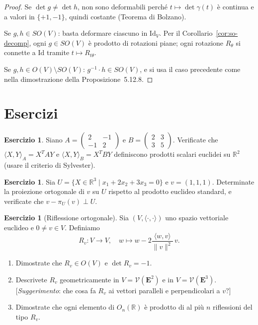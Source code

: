\documentclass[11pt, a4paper]{book}
\theoremstyle{definition}
\newtheorem{esercizio}[definizione]{Esercizio}
\theoremstyle{plain}
\theoremstyle{remark}
\newcommand{\R}{\mathbb{R}}
\newcommand{\Id}{\mathrm{Id}}
\begin{document}
\begin{proof}
Se $\det g \neq \det h$, non sono deformabili perché $t \mapsto \det\gamma(t)$ è continua e a valori in $\{+1,-1\}$, quindi costante (Teorema di Bolzano).

Se $g,h \in SO(V)$: basta deformare ciascuno in $\Id_V$. Per il Corollario~\ref{cor:so-decomp}, ogni $g \in SO(V)$ è prodotto di rotazioni piane; ogni rotazione $R_\theta$ si connette a $\Id$ tramite $t \mapsto R_{t\theta}$.

Se $g,h \in O(V)\setminus SO(V)$: $g^{-1}\cdot h \in SO(V)$, e si usa il caso precedente come nella dimostrazione della Proposizione~5.12.8.
\end{proof}

\section*{Esercizi}

\begin{esercizio}
Siano $A = \begin{pmatrix}2&-1\\-1&2\end{pmatrix}$ e $B = \begin{pmatrix}2&3\\3&5\end{pmatrix}$. Verificate che $\langle X,Y\rangle_A = X^T A Y$ e $\langle X,Y\rangle_B = X^T B Y$ definiscono prodotti scalari euclidei su $\R^2$ (usare il criterio di Sylvester).
\end{esercizio}

\begin{esercizio}
Sia $U = \{X \in \R^3 \mid x_1+2x_2+3x_3=0\}$ e $v=(1,1,1)$. Determinate la proiezione ortogonale di $v$ su $U$ rispetto al prodotto euclideo standard, e verificate che $v - \pi_U(v) \perp U$.
\end{esercizio}

\begin{esercizio}[Riflessione ortogonale]
Sia $(V,\langle\cdot,\cdot\rangle)$ uno spazio vettoriale euclideo e $0 \neq v \in V$. Definiamo
\[
  R_v \colon V \to V, \quad w \mapsto w - 2\frac{\langle w,v\rangle}{\|v\|^2}\,v.
\]
\begin{enumerate}
  \item Dimostrate che $R_v \in O(V)$ e $\det R_v = -1$.
  \item Descrivete $R_v$ geometricamente in $V = \mathcal{V}(\mathbf{E}^2)$ e in $V = \mathcal{V}(\mathbf{E}^3)$. [\emph{Suggerimento}: che cosa fa $R_v$ ai vettori paralleli e perpendicolari a $v$?]
  \item Dimostrate che ogni elemento di $O_n(\R)$ è prodotto di al più $n$ riflessioni del tipo $R_v$.
\end{enumerate}
\end{esercizio}
\end{document}
